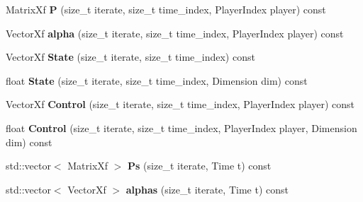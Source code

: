 \begin{DoxyCompactItemize}
\item 
Matrix\+Xf {\bfseries P} (size\+\_\+t iterate, size\+\_\+t time\+\_\+index, Player\+Index player) const \hypertarget{classilqgames_1_1_solver_log_a0bf49939b8e4b940067bf2157c621c93}{}\label{classilqgames_1_1_solver_log_a0bf49939b8e4b940067bf2157c621c93}

\item 
Vector\+Xf {\bfseries alpha} (size\+\_\+t iterate, size\+\_\+t time\+\_\+index, Player\+Index player) const \hypertarget{classilqgames_1_1_solver_log_a0234745c13f7426545dcf37ef759f7e3}{}\label{classilqgames_1_1_solver_log_a0234745c13f7426545dcf37ef759f7e3}

\item 
Vector\+Xf {\bfseries State} (size\+\_\+t iterate, size\+\_\+t time\+\_\+index) const \hypertarget{classilqgames_1_1_solver_log_a54b12edccfcfca015670cd6405b1b527}{}\label{classilqgames_1_1_solver_log_a54b12edccfcfca015670cd6405b1b527}

\item 
float {\bfseries State} (size\+\_\+t iterate, size\+\_\+t time\+\_\+index, Dimension dim) const \hypertarget{classilqgames_1_1_solver_log_a448f9cd63c6b6e889cb8791bc1902305}{}\label{classilqgames_1_1_solver_log_a448f9cd63c6b6e889cb8791bc1902305}

\item 
Vector\+Xf {\bfseries Control} (size\+\_\+t iterate, size\+\_\+t time\+\_\+index, Player\+Index player) const \hypertarget{classilqgames_1_1_solver_log_a7bfdf2a7a7ced357eafcd36e009425d3}{}\label{classilqgames_1_1_solver_log_a7bfdf2a7a7ced357eafcd36e009425d3}

\item 
float {\bfseries Control} (size\+\_\+t iterate, size\+\_\+t time\+\_\+index, Player\+Index player, Dimension dim) const \hypertarget{classilqgames_1_1_solver_log_a73a740dd13e6f8c3c8359294e7662687}{}\label{classilqgames_1_1_solver_log_a73a740dd13e6f8c3c8359294e7662687}

\item 
std\+::vector$<$ Matrix\+Xf $>$ {\bfseries Ps} (size\+\_\+t iterate, Time t) const \hypertarget{classilqgames_1_1_solver_log_ae958cea078e821259eed40c26904bfbf}{}\label{classilqgames_1_1_solver_log_ae958cea078e821259eed40c26904bfbf}

\item 
std\+::vector$<$ Vector\+Xf $>$ {\bfseries alphas} (size\+\_\+t iterate, Time t) const \hypertarget{classilqgames_1_1_solver_log_a995476b2148f34878345d42ab9fbbc53}{}\label{classilqgames_1_1_solver_log_a995476b2148f34878345d42ab9fbbc53}


\end{DoxyCompactItemize}
